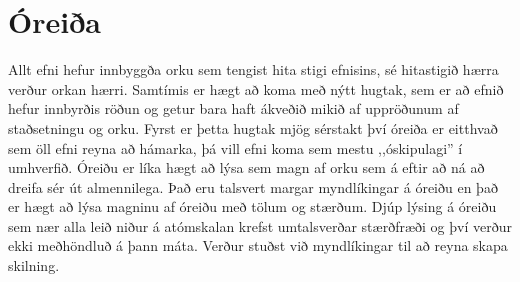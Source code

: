 \section{Óreiða}
Allt efni hefur innbyggða orku sem tengist hita stigi efnisins, sé hitastigið
hærra verður orkan hærri. Samtímis er hægt að koma með nýtt hugtak, sem er að
efnið hefur innbyrðis röðun og getur bara haft ákveðið mikið af uppröðunum
af staðsetningu og orku. Fyrst er þetta hugtak mjög sérstakt því óreiða er
eitthvað sem öll efni reyna að hámarka, þá vill efni koma sem mestu ,,óskipulagi''
í umhverfið. Óreiðu er líka hægt að lýsa sem magn af orku sem á eftir að
ná að dreifa sér út almennilega. Það eru talsvert margar myndlíkingar
á óreiðu en það er hægt að lýsa magninu af óreiðu með tölum og
stærðum. Djúp lýsing á óreiðu sem nær alla leið niður á atómskalan krefst
umtalsverðar stærðfræði og því verður ekki meðhöndluð á þann máta. 
Verður stuðst við myndlíkingar til að reyna skapa skilning.
